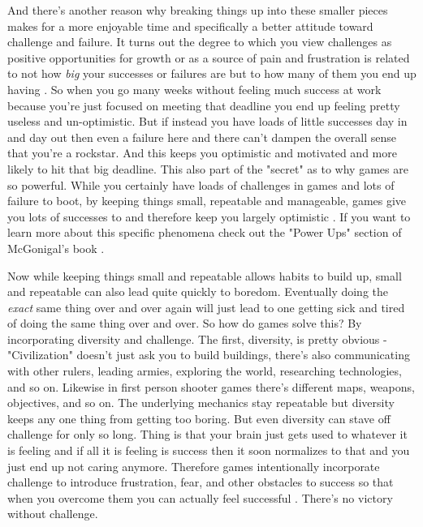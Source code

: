 \documentclass[11pt,a5paper]{book}
\begin{document}
And there's another reason why breaking things up into these smaller pieces makes for a more enjoyable time and specifically a better attitude toward challenge and failure. It turns out the degree to which you view challenges as positive opportunities for growth or as a source of pain and frustration is related to not how \textit{big} your successes or failures are but to how many of them you end up having \cite{superbetter}. So when you go many weeks without feeling much success at work because you're just focused on meeting that deadline you end up feeling pretty useless and un-optimistic. But if instead you have loads of little successes day in and day out then even a failure here and there can't dampen the overall sense that you're a rockstar. And this keeps you optimistic and motivated and more likely to hit that big deadline. This also part of the "secret" as to why games are so powerful. While you certainly have loads of challenges in games and lots of failure to boot, by keeping things small, repeatable and manageable, games give you lots of successes to and therefore keep you largely optimistic \cite{superbetter}. If you want to learn more about this specific phenomena check out the "Power Ups" section of McGonigal's book \cite{superbetter}. 
\newline

Now while keeping things small and repeatable allows habits to build up, small and repeatable can also lead quite quickly to boredom. Eventually doing the \textit{exact} same thing over and over again will just lead to one getting sick and tired of doing the same thing over and over. So how do games solve this? By incorporating diversity and challenge. The first, diversity, is pretty obvious - "Civilization" doesn't just ask you to build buildings, there's also communicating with other rulers, leading armies, exploring the world, researching technologies, and so on. Likewise in first person shooter games there's different maps, weapons, objectives, and so on. The underlying mechanics stay repeatable but diversity keeps any one thing from getting too boring. But even diversity can stave off challenge for only so long. Thing is that your brain just gets used to whatever it is feeling and if all it is feeling is success then it soon normalizes to that and you just end up not caring anymore. Therefore games intentionally incorporate challenge to introduce frustration, fear, and other obstacles to success so that when you overcome them you can actually feel successful \cite{superbetter}. There's no victory without challenge. 
\newline
\end{document}
